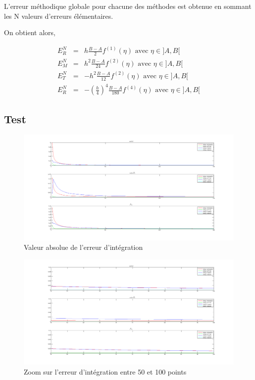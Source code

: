 \documentclass[a4paper,10pt]{report}
\begin{document}
L’erreur méthodique globale pour chacune des méthodes est obtenue en sommant les N valeurs d’erreurs élémentaires. 

On obtient alors,

\begin{eqnarray}
E^{N}_{R} &=& h \frac{B-A}{2}f^{(1)}(\eta) \text{ avec } \eta \in ]A, B[\\
E^{N}_{M} &=& h^2 \frac{B-A}{24}f^{(2)}(\eta) \text{ avec } \eta \in ]A, B[\\
E^{N}_{T} &=& -h^2 \frac{B-A}{12}f^{(2)}(\eta) \text{ avec } \eta \in ]A, B[\\
E^{N}_{R} &=& -\left(\frac{h}{4}\right)^4 \frac{B-A}{180}f^{(4)}(\eta) \text{ avec } \eta \in ]A, B[
\end{eqnarray}


\subsection*{Test}

\begin{center}

\end{center}

\begin{figure}[H]
	\begin{center}
		\includegraphics[scale=0.5]{error}
		\caption{Valeur absolue de l'erreur d'intégration}
	\end{center}
\end{figure}

\begin{figure}[H]
	\begin{center}
		\includegraphics[scale=0.5]{error2}
		\caption{Zoom sur l'erreur d'intégration entre 50 et 100 points}
	\end{center}
\end{figure}
\end{document}
